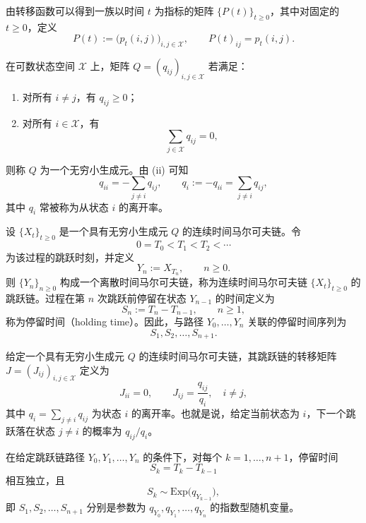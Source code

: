 	 由转移函数可以得到一族以时间 $t$ 为指标的矩阵 $\{P(t)\}_{t\ge0}$，其中对固定的 $t\ge0$，定义
	 \[
	 P(t) := \bigl(p_t(i,j)\bigr)_{i,j\in\mathcal{X}}, \qquad
	 P(t)_{ij} = p_t(i,j).
	 \]
	 
	 \begin{definition}[无穷小生成元]\label{def:q-matrix}
	 	在可数状态空间 $\mathcal{X}$ 上，矩阵 $Q = (q_{ij})_{i,j\in\mathcal{X}}$ 若满足：
	 	\begin{enumerate}
	 		\item[(i)] 对所有 $i\neq j$，有 $q_{ij}\ge 0$；
	 		\item[(ii)] 对所有 $i\in\mathcal{X}$，有
	 		\[
	 		\sum_{j\in\mathcal{X}} q_{ij} = 0,
	 		\]
	 	\end{enumerate}
	 	则称 $Q$ 为一个无穷小生成元。由 (ii) 可知
	 	\[
	 	q_{ii} = -\sum_{j\neq i} q_{ij}, \qquad
	 	q_i := -q_{ii} = \sum_{j\neq i} q_{ij},
	 	\]
	 	其中 $q_i$ 常被称为从状态 $i$ 的离开率。
	 \end{definition}
	 
	 设 $\{X_t\}_{t\ge0}$ 是一个具有无穷小生成元 $Q$ 的连续时间马尔可夫链。令
	 \[
	 0 = T_0 < T_1 < T_2 < \cdots
	 \]
	 为该过程的跳跃时刻，并定义
	 \[
	 Y_n := X_{T_n}, \qquad n\ge0.
	 \]
	 则 $\{Y_n\}_{n\ge0}$ 构成一个离散时间马尔可夫链，称为连续时间马尔可夫链 $\{X_t\}_{t\ge0}$ 的跳跃链。过程在第 $n$ 次跳跃前停留在状态 $Y_{n-1}$ 的时间定义为
	 \[
	 S_n := T_n - T_{n-1}, \qquad n\ge1,
	 \]
	 称为停留时间（holding time）。因此，与路径 $Y_0,\dots,Y_n$ 关联的停留时间序列为
	 \[
	 S_1,S_2,\dots,S_{n+1}.
	 \]
	 
	 \begin{lemma}
	 	给定一个具有无穷小生成元 $Q$ 的连续时间马尔可夫链，其跳跃链的转移矩阵 $J = (J_{ij})_{i,j\in\mathcal{X}}$ 定义为
	 	\[
	 	J_{ii} = 0, \qquad
	 	J_{ij} = \frac{q_{ij}}{q_i}, \quad i\neq j,
	 	\]
	 	其中 $q_i = \sum_{j\neq i} q_{ij}$ 为状态 $i$ 的离开率。也就是说，给定当前状态为 $i$，下一个跳跃落在状态 $j\neq i$ 的概率为 $q_{ij}/q_i$。
	 \end{lemma}
	 
	 \begin{lemma}
	 	在给定跳跃链路径 $Y_0,Y_1,\ldots,Y_n$ 的条件下，对每个 $k=1,\ldots,n+1$，停留时间
	 	\[
	 	S_k = T_k - T_{k-1}
	 	\]
	 	相互独立，且
	 	\[
	 	S_k \sim \mathrm{Exp}\bigl(q_{Y_{k-1}}\bigr),
	 	\]
	 	即 $S_1,S_2,\ldots,S_{n+1}$ 分别是参数为 $q_{Y_0},q_{Y_1},\ldots,q_{Y_n}$ 的指数型随机变量。
	 \end{lemma}
	 
